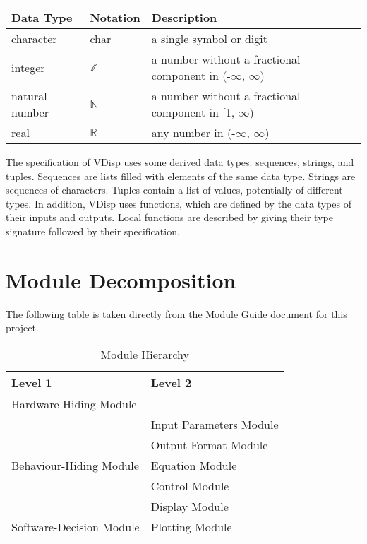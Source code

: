 \documentclass[12pt, titlepage]{article}
\begin{document}
\begin{center}
\renewcommand{\arraystretch}{1.2}
\noindent 
\begin{tabular}{l l p{7.5cm}} 
\toprule 
\textbf{Data Type} & \textbf{Notation} & \textbf{Description}\\ 
\midrule
character & char & a single symbol or digit\\
integer & $\mathbb{Z}$ & a number without a fractional component in (-$\infty$, $\infty$) \\
natural number & $\mathbb{N}$ & a number without a fractional component in [1, $\infty$) \\
real & $\mathbb{R}$ & any number in (-$\infty$, $\infty$)\\
\bottomrule
\end{tabular} 
\end{center}

\noindent
The specification of VDisp uses some derived data types: sequences, strings, and
tuples. Sequences are lists filled with elements of the same data type. Strings
are sequences of characters. Tuples contain a list of values, potentially of
different types. In addition, VDisp uses functions, which
are defined by the data types of their inputs and outputs. Local functions are
described by giving their type signature followed by their specification.

\section{Module Decomposition}

The following table is taken directly from the Module Guide document for this project.

\begin{table}[h!]
\centering
\begin{tabular}{p{} p{}}
\toprule
\textbf{Level 1} & \textbf{Level 2}\\
\midrule

{Hardware-Hiding Module} & ~ \\
\midrule

\multirow{5}{0.3\textwidth}{Behaviour-Hiding Module} & Input Parameters Module\\
& Output Format Module\\
& Equation Module\\
& Control Module\\
& Display Module \\
\midrule

{Software-Decision Module} & Plotting Module\\
\bottomrule

\end{tabular}
\caption{Module Hierarchy}
\label{TblMH}
\end{table}
  
\end{document}
